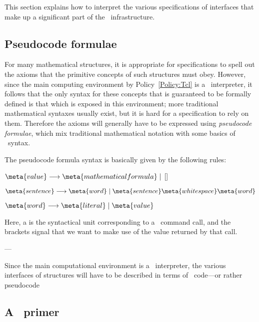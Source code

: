 \documentclass{mtmtcl}
\theoremstyle{plain}
\theoremstyle{remark}
\begin{document}
This section explains how to interpret the various specifications of 
interfaces that make up a significant part of the \mtl\ 
infrastructure.


\subsection{Pseudocode formulae}

For many mathematical structures, it is appropriate for 
specifications to spell out the axioms that the primitive concepts of 
such structures must obey. However, since the main computing environment 
by Policy~\ref{Policy:Tcl} is a \Tcl\ interpreter, it follows that the 
only syntax for these concepts that is guaranteed to be formally defined 
is that which is exposed in this environment; more traditional 
mathematical syntaxes usually exist, but it is hard for a 
specification to rely on them. 
Therefore the axioms will generally have to be expressed using 
\emph{pseudocode formulae}, which mix traditional mathematical 
notation with some basics of \Tcl\ syntax.

The pseudocode formula syntax is basically given by the following 
rules:
\begin{displaysyntax}
  \(\meta{value} \longrightarrow \meta{mathematical formula} \mid 
  {}\)[\meta{sentence}]\par
  \(\meta{sentence} \longrightarrow \meta{word} \mid
  \meta{sentence}\meta{whitespace}\meta{word}\)\par
  \(\meta{word} \longrightarrow \meta{literal} \mid \meta{value}\)
\end{displaysyntax}
Here, a  is the syntactical unit corresponding to a 
\Tcl\ command call, and the brackets signal that we want to make use 
of the value returned by that call. 

---

Since the main computational environment is a \Tcl\ interpreter, the 
various interfaces of structures will have to be described in terms 
of \Tcl\ code---or rather pseudocode 


\subsection{A \Tcl\ primer}
\end{document}
